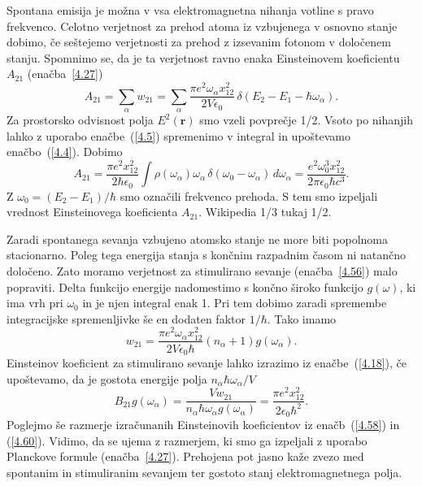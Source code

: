 Spontana emisija je možna v vsa elektromagnetna nihanja votline s
pravo frekvenco. Celotno verjetnost za prehod atoma iz vzbujenega
v osnovno stanje dobimo, če seštejemo verjetnosti za prehod z izsevanim fotonom 
v določenem stanju. Spomnimo se, da je ta verjetnost ravno enaka 
Einsteinovem koeficientu $A_{21}$ (enačba~\ref{4.27})
\begin{equation}
A_{21}=\sum_{\alpha}w_{21}=\sum_{\alpha}\frac{\pi 
e^{2}\omega_{\alpha}x_{12}^{2}}{2V\epsilon_{0}}\,\delta(E_{2}-E_{1}-\hbar\omega_{\alpha}).
\label{4.57}
\end{equation}
Za prostorsko odvisnost polja $E^{2}(\mathbf{r})$ smo vzeli povprečje
1/2. Vsoto po nihanjih lahko z uporabo enačbe~(\ref{4.5}) spremenimo v integral
in upoštevamo enačbo~(\ref{4.4}). Dobimo
\begin{equation}
A_{21}=\frac{\pi e^{2}x_{12}^{2}}{2\hbar\epsilon_{0}}\int\rho(\omega_{\alpha})\omega_\alpha\, 
\delta(\omega_{0}-\omega_{\alpha})\, d\omega_{\alpha}=\frac{e^{2}\omega_{0}^{3}x_{12}^{2}}{2\pi\epsilon_{0}\hbar c^{3}}.
\label{4.58}
\end{equation}
 Z $\omega_{0}=(E_{2}-E_{1})/\hbar$ smo označili frekvenco prehoda. S tem smo 
 izpeljali vrednost Einsteinovega koeficienta $A_{21}$. 
 Wikipedia 1/3 tukaj 1/2.

Zaradi spontanega sevanja vzbujeno atomsko stanje ne more biti popolnoma
stacionarno. Poleg tega energija stanja s končnim razpadnim časom ni natančno
določeno. Zato moramo verjetnost za stimulirano sevanje (enačba~\ref{4.56}) malo 
popraviti. Delta funkcijo energije nadomestimo s končno široko funkcijo $g(\omega)$, 
ki ima vrh pri $\omega_{0}$ in je njen integral enak 1. Pri tem dobimo zaradi 
spremembe integracijske spremenljivke še en dodaten faktor $1/\hbar$. Tako imamo 
\begin{equation}
w_{21}=\frac{\pi e^{2}\omega_{\alpha}x_{12}^{2}}{2V\epsilon_{0}\hbar}
(n_{\alpha}+1)g(\omega_{\alpha}).
\label{4.59}
\end{equation}
Einsteinov koeficient za stimulirano sevanje lahko izrazimo iz enačbe~(\ref{4.18}), 
če upoštevamo, da je gostota energije polja $n_{\alpha}\hbar\omega_{\alpha}/V$
\begin{equation}
B_{21}g(\omega_{\alpha})=\frac{Vw_{21}}{n_{\alpha}\hbar\omega_{\alpha} g(\omega_{\alpha})}
=\frac{\pi e^{2}x_{12}^{2}}{2\epsilon_{0}\hbar^{2}}.
\label{4.60}
\end{equation}
Poglejmo  še razmerje izračunanih Einsteinovih koeficientov iz enačb~(\ref{4.58}) in 
(\ref{4.60}). Vidimo, da se ujema z razmerjem, ki smo ga izpeljali z uporabo
Planckove formule (enačba~\ref{4.27}). Prehojena pot jasno kaže zvezo med spontanim in
stimuliranim sevanjem ter gostoto stanj elektromagnetnega polja. 
